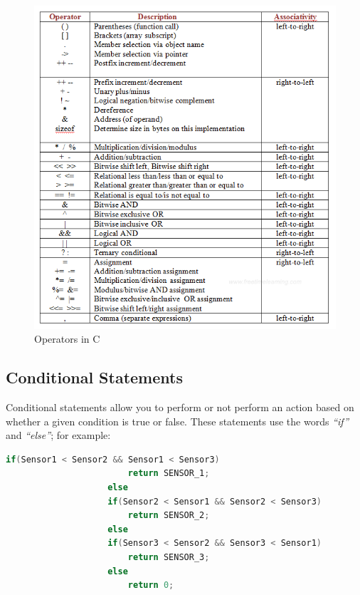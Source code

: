             \begin{figure}[!ht]
                    \centering
                    \captionsetup{justification=centering,margin=0.05cm}
                    \includegraphics[width=\columnwidth]{figures/operators-in-c.png}
                    \caption{\label{fig:operators-in-c}Operators in C}
            \end{figure}

        \subsection{Conditional Statements}
            
            Conditional statements allow you to perform or not perform an action based on whether a given condition is true or false. These statements use the words \textit{“if”} and \textit{“else”}; for example:
                
                \begin{lstlisting}[style=mystyle_c, language=c, breaklines]
                    if(Sensor1 < Sensor2 && Sensor1 < Sensor3)
                        return SENSOR_1;   
                    else 
                    if(Sensor2 < Sensor1 && Sensor2 < Sensor3)
                        return SENSOR_2;     
                    else 
                    if(Sensor3 < Sensor2 && Sensor3 < Sensor1)
                        return SENSOR_3;     
                    else
                        return 0;
                \end{lstlisting} 
    

